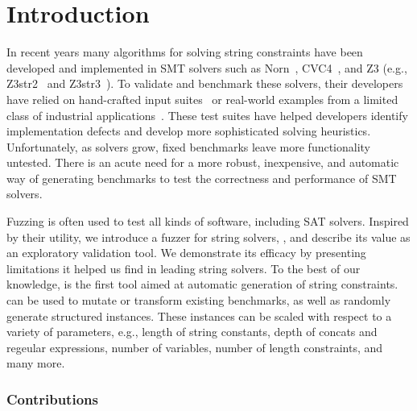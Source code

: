 \section{Introduction}

In recent years many algorithms for solving string constraints have
been developed and implemented in SMT solvers such as Norn~\cite{norn},
CVC4~\cite{cvc4}, and Z3 (e.g., Z3str2~\cite{z3str2} and Z3str3~\cite{z3str3}).
To validate and benchmark these solvers, their developers have relied on
hand-crafted input suites~\cite{cvc4-tests,z3str3-tests,z3str2-tests} or
real-world examples from a limited class of industrial
applications~\cite{kaluza,kausler}. These test suites have helped
developers identify implementation defects and develop more
sophisticated solving heuristics. Unfortunately, as solvers grow,
fixed benchmarks leave more functionality untested.
There is an acute need for a more robust, inexpensive, and automatic way
of generating benchmarks to test
the correctness and performance of SMT solvers.

Fuzzing is often used to test all kinds of software,
including SAT solvers. Inspired by their utility, we introduce a
fuzzer for string solvers, \fuzzer{}, and describe its value as an
exploratory validation tool. We demonstrate its efficacy
by presenting limitations it helped us find in
leading string solvers. To the best of our knowledge, \fuzzer{} is the
first tool aimed at automatic generation of string constraints. \fuzzer{} can be
used to mutate or transform existing benchmarks, as well as
randomly generate structured instances. These instances can be scaled with respect
to a variety of parameters, e.g., length of string constants,
depth of concats and regeular expressions, number of variables,
number of length constraints, and many more.

\subsubsection{Contributions}

